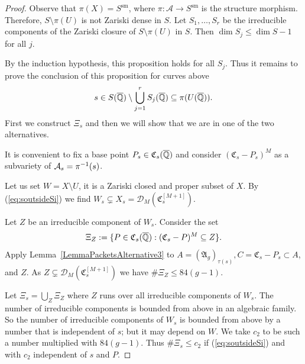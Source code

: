 \begin{proof}
Observe that $\pi(X)=S^{\mathrm{sm}}$, where
$\pi\colon \mathcal{A} \rightarrow S^{\mathrm{sm}}$ 
is the structure
morphism.
Therefore, $S \setminus \pi(U)$ is not Zariski dense in
$S$. %
Let $S_1,\ldots, S_r$ be the irreducible components of the
Zariski closure of $S\setminus \pi(U)$ in $S$. Then $\dim S_j \le \dim
S - 1$ for all $j$.

By the induction hypothesis, this proposition holds for all $S_j$. Thus it
remains to prove the conclusion of this proposition for curves above
\begin{equation}
\label{eq:soutsideSi}
s \in S({\overline{\mathbb{Q}}}) \setminus \bigcup_{j=1}^r S_j({\overline{\mathbb{Q}}}) \subseteq \pi(U({\overline{\mathbb{Q}}})).
\end{equation}
 First we construct $\Xi_s$ and then
we will show that we are in one of the two alternatives. 

It is convenient to fix a base point $P_s\in
\mathfrak{C}_s({\overline{\mathbb{Q}}})$ and consider $(\mathfrak{C}_s - P_s)^M$
as a subvariety of $\mathcal{A}_s = \pi^{-1}(s)$. 

Let us set $W = X\setminus U$, it is a Zariski closed and proper
subset of $X$.  By (\ref{eq:soutsideSi}) we find  $W_s\subsetneq X_s = \mathscr{D}_M(\mathfrak{C}_s^{[M+1]})$. 

Let $Z$ be an irreducible component of
$W_s$. 
Consider the set
\[
\Xi_Z := \{ P \in \mathfrak{C}_s(\IQbar) : ( \mathfrak{C}_s- P)^M
\subseteq Z \}. %
\]
Apply Lemma~\ref{LemmaPacketsAlternative3} to $A =
(\mathfrak{A}_g)_{\tau(s)}, C=\mathfrak{C}_s-P_s\subset A$, and $Z$. As $Z\subsetneq
\mathscr{D}_M(\mathfrak{C}_s^{[M+1]})$  we have $\#\Xi_Z \le 84(g-1)$.

Let $\Xi_s = \bigcup_Z \Xi_Z$ where $Z$ runs over all irreducible
components of $W_s$. The number of irreducible components  is
bounded from above in an algebraic family.
So the number of irreducible components of $W_s$
is bounded from above by a number that  is independent of $s$; but it may depend on $W$.  We take
$c_2$ to be such a number multiplied with $84(g-1)$. Thus
$\#\Xi_s \le c_2$ if (\ref{eq:soutsideSi}) and with $c_2$ independent
of $s$ and $P$.


\end{proof}
